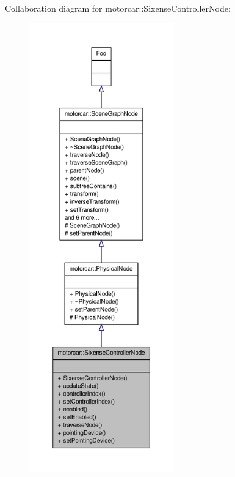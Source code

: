 Collaboration diagram for motorcar\-:\-:Sixense\-Controller\-Node\-:
\nopagebreak
\begin{figure}[H]
\begin{center}
\leavevmode
\includegraphics[height=550pt]{classmotorcar_1_1SixenseControllerNode__coll__graph}
\end{center}
\end{figure}
